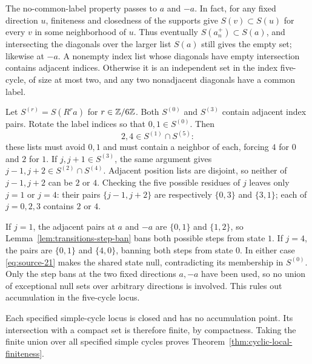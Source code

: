 The no-common-label property passes to $a$ and $-a$.  In fact, for
any fixed direction $u$, finiteness and closedness of the supports
give $S(v)\subset S(u)$ for every $v$ in some neighborhood of $u$.
Thus eventually $S(a_n^+)\subset S(a)$, and intersecting the
diagonals over the larger list $S(a)$ still gives the empty set;
likewise at $-a$.  A nonempty index list whose diagonals have empty
intersection contains adjacent indices.  Otherwise it is an
independent set in the index five-cycle, of size at most two, and
any two nonadjacent diagonals have a common label.

Let $S^{(r)}=S(R^ra)$ for $r\in\mathbb Z/6\mathbb Z$.  Both $S^{(0)}$ and
$S^{(3)}$ contain adjacent index pairs.  Rotate the label indices
so that $0,1\in S^{(0)}$.  Then
\[
 2,4\in S^{(1)}\cap S^{(5)}:
\]
these lists must avoid $0,1$ and must contain a neighbor of each,
forcing $4$ for $0$ and $2$ for $1$.  If $j,j+1\in S^{(3)}$, the
same argument gives $j-1,j+2\in S^{(2)}\cap S^{(4)}$.  Adjacent
position lists are disjoint, so neither of $j-1,j+2$ can be $2$ or
$4$.  Checking the five possible residues of $j$ leaves only
$j=1$ or $j=4$: their pairs $\{j-1,j+2\}$ are respectively
$\{0,3\}$ and $\{3,1\}$; each of $j=0,2,3$ contains $2$ or $4$.

If $j=1$, the adjacent pairs at $a$ and $-a$ are $\{0,1\}$ and
$\{1,2\}$, so Lemma~\ref{lem:transitions-step-ban} bans both
possible steps from state $1$.  If $j=4$, the pairs are
$\{0,1\}$ and $\{4,0\}$, banning both steps from state $0$.
In either case \eqref{eq:source-21} makes the shared state null,
contradicting its membership in $S^{(0)}$.  Only the step bans at
the two fixed directions $a,-a$ have been used, so no union of
exceptional null sets over arbitrary directions is involved.
This rules out accumulation in the five-cycle locus.

Each specified simple-cycle locus is closed and has no accumulation
point.  Its intersection with a compact set is therefore finite,
by compactness.  Taking the finite union over all specified simple
cycles proves Theorem~\ref{thm:cyclic-local-finiteness}.
